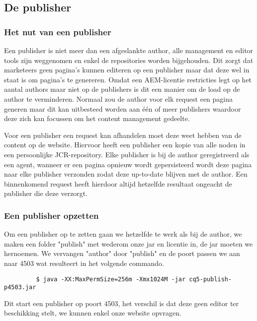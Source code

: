 \documentclass{article}
\begin{document}
	\subsection{De publisher}
	\subsubsection{Het nut van een publisher}
	Een publisher is niet meer dan een afgeslankte author, alle management en editor tools zijn weggenomen en enkel de repositories worden bijgehouden. Dit zorgt dat marketeers geen pagina's kunnen editeren op een publisher maar dat deze wel in staat is om pagina's te genereren. Omdat een AEM-licentie restricties legt op het aantal authors maar niet op de publishers is dit een manier om de load op de author te verminderen. Normaal zou de author voor elk request een pagina generen maar dit kan uitbesteed worden aan \'e\'en of meer publishers waardoor deze zich kan focussen om het content management gedeelte.
	\par
	Voor een publisher een request kan afhandelen moet deze weet hebben van de content op de website. Hiervoor heeft een publisher een kopie van alle noden in een persoonlijke JCR-repository. Elke publisher is bij de author geregistreerd als een agent, wanneer er een pagina opnieuw wordt gepersisteerd wordt deze pagina naar elke publisher verzonden zodat deze up-to-date blijven met de author. Een binnenkomend request heeft hierdoor altijd hetzelfde resultaat ongeacht de publisher die deze verzorgt.
	\subsubsection{Een publisher opzetten}
	Om een publisher op te zetten gaan we hetzelfde te werk als bij de author, we maken een folder "publish" met wederom onze jar en licentie in, de jar moeten we hernoemen. We vervangen "author" door "publish" en de poort passen we aan naar 4503 wat resulteert in het volgende commando.	
	\begin{lstlisting}
		 $ java -XX:MaxPermSize=256m -Xmx1024M -jar cq5-publish-p4503.jar
	\end{lstlisting}
	 Dit start een publisher op poort 4503, het verschil is dat deze geen editor ter beschikking stelt, we kunnen enkel onze website opvragen.
\end{document}
